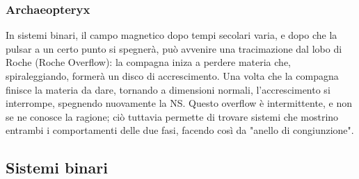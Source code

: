 \subsubsection{Archaeopteryx}
In sistemi binari, il campo magnetico dopo tempi secolari varia, e dopo che la pulsar a un certo punto si spegnerà, può avvenire una tracimazione dal lobo di Roche (Roche Overflow): la compagna iniza a perdere materia che, spiraleggiando, formerà un disco di accrescimento.
Una volta che la compagna finisce la materia da dare, tornando a dimensioni normali, l'accrescimento si interrompe, spegnendo nuovamente la NS.
Questo overflow è intermittente, e non se ne conosce la ragione; ciò tuttavia permette di trovare sistemi che mostrino entrambi i comportamenti delle due fasi, facendo così da "anello di congiunzione".

\subsection{Sistemi binari}


